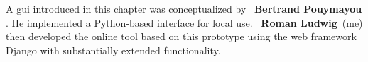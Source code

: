 \begin{tcolorbox}[
    title=\faIcon{users} Contributions,
    parbox=false,
    float
]
    A \acrlong{gui} introduced in this chapter was conceptualized by ~\textbf{Bertrand Pouymayou} \cite{pouymayou_analysis_2019}. He implemented a Python-based interface for local use. ~\textbf{Roman Ludwig}~(me) then developed the online tool \inlinelyproxlogo{} based on this prototype using the web framework Django \cite{noauthor_django_2022} with substantially extended functionality.
\end{tcolorbox}
